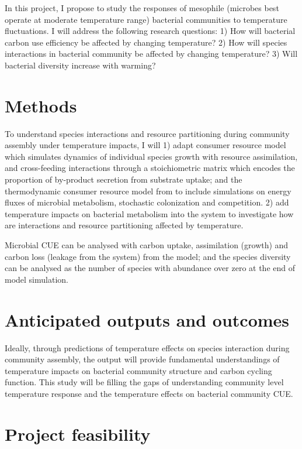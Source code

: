 \documentclass[11pt, a4paper]{article}
\begin{document}
\begin{spacing}{1.5}
In this project, I propose to study the responses of mesophile (microbes best operate at moderate temperature range) bacterial communities to temperature fluctuations. I will address the following research questions: 1) How will bacterial carbon use efficiency be affected by changing temperature? 2) How will species interactions in bacterial community be affected by changing temperature? 3) Will bacterial diversity increase with warming? 

\section{Methods}
To understand species interactions and resource partitioning during community assembly under temperature impacts, I will 1) adapt consumer resource model \citep{goldford2018emergent} which simulates dynamics of individual species growth with resource assimilation, and cross-feeding interactions through a stoichiometric matrix which encodes the proportion of by-product secretion from substrate uptake; and the thermodynamic consumer resource model from \cite{marsland2019available} to include simulations on energy fluxes of microbial metabolism, stochastic colonization and competition. 2) add temperature impacts on bacterial metabolism into the system to investigate how are interactions and resource partitioning affected by temperature.

Microbial CUE can be analysed with carbon uptake, assimilation (growth) and carbon loss (leakage from the system) from the model; and the species diversity can be analysed as the number of species with abundance over zero at the end of model simulation.

\section{Anticipated outputs and outcomes}

Ideally, through predictions of temperature effects on species interaction during community assembly, the output will provide fundamental understandings of temperature impacts on bacterial community structure and carbon cycling function. This study will be filling the gaps of understanding community level temperature response and the temperature effects on bacterial community CUE.  

\section{Project feasibility}


\end{spacing}
\end{document}
